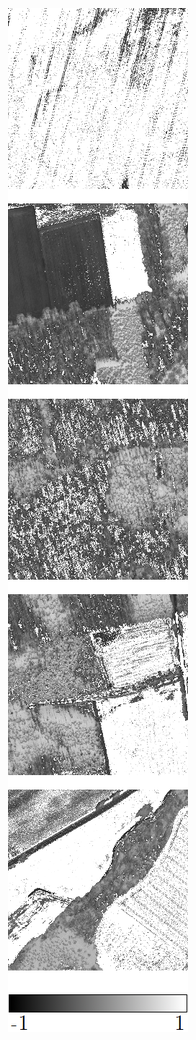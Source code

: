 \begin{figure}
\begin{subfigure}{\VegetationImageWidth}
        \caption{}
        \label{fig:svi_rvi}
    \end{subfigure} \hspace{2mm}
    \begin{subfigure}{\VegetationImageWidth}
        \includegraphics[width=\textwidth]{images/vegetation/ndvi}

\end{subfigure}
\end{figure}
